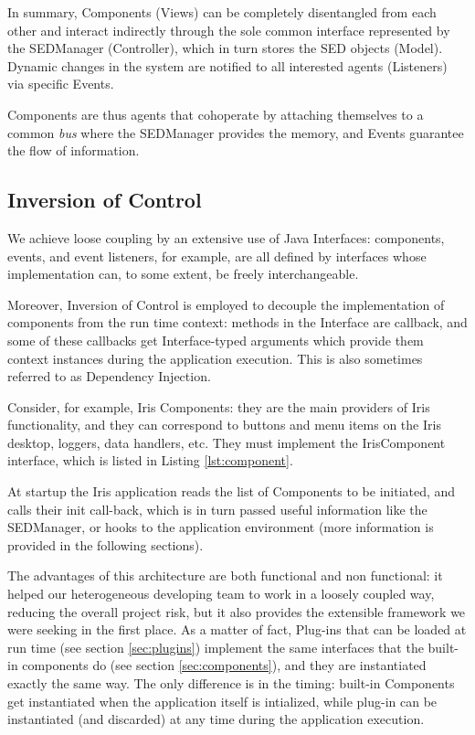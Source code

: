 In summary, Components (Views) can be completely disentangled from each other and interact indirectly through the sole common interface represented by the SEDManager (Controller), which in turn stores the SED objects (Model). Dynamic changes in the system are notified to all interested agents (Listeners) via specific Events.

Components are thus agents that cohoperate by attaching themselves to a common \emph{bus} where the SEDManager provides the memory, and Events guarantee the flow of information.

\subsection{Inversion of Control}
We achieve loose coupling by an extensive use of Java Interfaces: components, events, and event listeners, for example, are all defined by interfaces whose implementation can, to some extent, be freely interchangeable.

Moreover, Inversion of Control is employed to decouple the implementation of components from the run time context: methods in the Interface are callback, and some of these callbacks get Interface-typed arguments which provide them context instances during the application execution. This is also sometimes referred to as Dependency Injection.

Consider, for example, Iris Components: they are the main providers of Iris functionality, and they can correspond to buttons and menu items on the Iris desktop, loggers, data handlers, etc. They must implement the IrisComponent interface, which is listed in Listing \ref{lst:component}.

At startup the Iris application reads the list of Components to be initiated, and calls their init call-back, which is in turn passed useful information like the SEDManager, or hooks to the application environment (more information is provided in the following sections).

The advantages of this architecture are both functional and non functional: it helped our heterogeneous developing team to work in a loosely coupled way, reducing the overall project risk, but it also provides the extensible framework we were seeking in the first place. As a matter of fact, Plug-ins that can be loaded at run time (see section \ref{sec:plugins}) implement the same interfaces that the built-in components do (see section \ref{sec:components}), and they are instantiated exactly the same way. The only difference is in the timing: built-in Components get instantiated when the application itself is intialized, while plug-in can be instantiated (and discarded) at any time during the application execution.